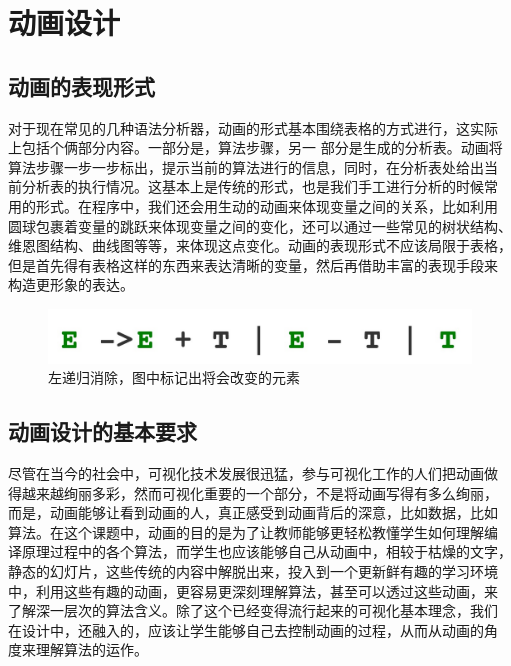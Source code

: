 \section{动画设计}
\subsection{动画的表现形式}
对于现在常见的几种语法分析器，动画的形式基本围绕表格的方式进行，这实际
上包括个俩部分内容。一部分是，算法步骤，另一 部分是生成的分析表。动画将
算法步骤一步一步标出，提示当前的算法进行的信息，同时，在分析表处给出当
前分析表的执行情况。这基本上是传统的形式，也是我们手工进行分析的时候常
用的形式。在程序中，我们还会用生动的动画来体现变量之间的关系，比如利用
圆球包裹着变量的跳跃来体现变量之间的变化，还可以通过一些常见的树状结构、
维恩图结构、曲线图等等，来体现这点变化。动画的表现形式不应该局限于表格，
但是首先得有表格这样的东西来表达清晰的变量，然后再借助丰富的表现手段来
构造更形象的表达。
\begin{figure}[!htb]
\centering
\includegraphics[width=0.7\linewidth]{img/recursive.jpg}
\caption{左递归消除，图中标记出将会改变的元素}
\label{fig:recursive.jpg}
\end{figure}
\subsection{动画设计的基本要求}
尽管在当今的社会中，可视化技术发展很迅猛，参与可视化工作的人们把动画做
得越来越绚丽多彩，然而可视化重要的一个部分，不是将动画写得有多么绚丽，
而是，动画能够让看到动画的人，真正感受到动画背后的深意，比如数据，比如
算法。在这个课题中，动画的目的是为了让教师能够更轻松教懂学生如何理解编
译原理过程中的各个算法，而学生也应该能够自己从动画中，相较于枯燥的文字，
静态的幻灯片，这些传统的内容中解脱出来，投入到一个更新鲜有趣的学习环境
中，利用这些有趣的动画，更容易更深刻理解算法，甚至可以透过这些动画，来
了解深一层次的算法含义。除了这个已经变得流行起来的可视化基本理念，我们
在设计中，还融入的，应该让学生能够自己去控制动画的过程，从而从动画的角
度来理解算法的运作。
